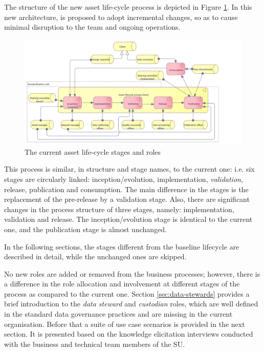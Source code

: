 	The structure of the new asset life-cycle process is depicted in Figure \ref{fig:lifecycle-new}. In this new architecture, is proposed to adopt incremental changes, so as to cause minimal disruption to the team and ongoing operations.

	\begin{figure}[h]
		\centering
		\includegraphics[width=1.05\textwidth]{images/business/Lifecycle (new).png}
		\caption{The current asset life-cycle stages and roles}
		\label{fig:lifecycle-new}
	\end{figure}
	
	This process is similar, in structure and stage names, to the current one: i.e. six stages are circularly linked: inception/evolution, implementation, \textit{validation}, release, publication and consumption. The main difference in the stages is the replacement of the pre-release by a validation stage. Also, there are significant changes in the process structure of three stages, namely: implementation, validation and release. The inception/evolution stage is identical to the current one, and the publication stage is almost unchanged. 
	
	In the following sections, the stages different from the baseline lifecycle are described in detail, while the unchanged ones are skipped.
		
	No new roles are added or removed from the business processes; however, there is a difference in the role allocation and involvement at different stages of the process as compared to the current one. Section \ref{sec:data-stewards} provides a brief introduction to the \textit{data steward} and \textit{custodian} roles, which are well defined in the standard data governance practices and are missing in the current organisation. Before that a suite of use case scenarios is provided in the next section. It is presented based on the knowledge elicitation interviews conducted with the business and technical team members of the SU. 

